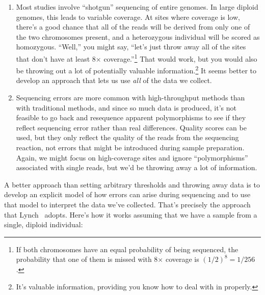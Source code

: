 \begin{enumerate}

\item Most studies involve ``shotgun'' sequencing of entire
  genomes. In large diploid genomes, this leads to variable
  coverage. At sites where coverage is low, there's a good chance that
  all of the reads will be derived from only one of the two
  chromosomes present, and a heterozygous individual will be scored as
  homozygous. ``Well,'' you might say, ``let's just throw away all of
  the sites that don't have at least 8$\times$ coverage.''\footnote{If
    both chromosomes have an equal probability of being sequenced, the
    probability that one of them is missed with 8$\times$ coverage is
    $(1/2)^8 = 1/256$.} That would work, but you would also be
  throwing out a lot of potentially valuable information.\footnote{It's
    valuable information, providing you know how to deal with in
    properly.} It seems better to develop an approach that lets us use
  {\it all\/} of the data we collect.

\item Sequencing errors are more common with high-throughput methods
  than with traditional methods, and since so much data is produced,
  it's not feasible to go back and resequence apparent polymorphisms
  to see if they reflect sequencing error rather than real
  differences. Quality scores can be used, but they only reflect the
  quality of the reads from the sequencing reaction, not errors that
  might be introduced during sample preparation. Again, we might focus
  on high-coverage sites and ignore ``polymorphisms'' associated with
  single reads, but we'd be throwing away a lot of information. 

\end{enumerate}
A better approach than setting arbitrary thresholds and throwing away
data is to develop an explicit model of how errors can arise during
sequencing and to use that model to interpret the data we've
collected. That's precisely the approach that Lynch~\cite{Lynch-2008}
adopts. Here's how it works assuming that we have a sample from a
single, diploid individual:

